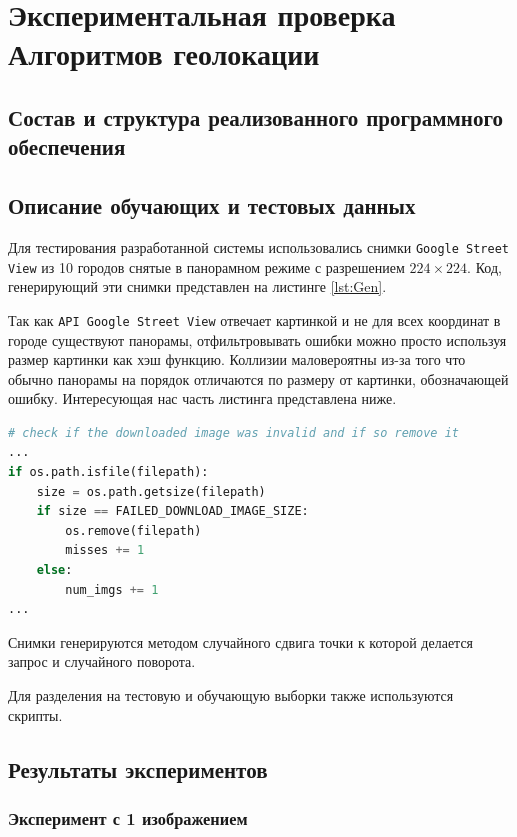 \chapter{Экспериментальная проверка Алгоритмов геолокации}

\section{Состав и структура реализованного программного обеспечения}

\section{Описание обучающих и тестовых данных}

Для тестирования разработанной системы использовались снимки \texttt{Google Street View} из 10 городов снятые в панорамном режиме с разрешением $ 224\times224 $. Код, генерирующий эти снимки представлен на листинге \ref{lst:Gen}.

Так как \texttt{API Google Street View} отвечает картинкой и не для всех координат в городе существуют панорамы, отфильтровывать ошибки можно просто используя размер картинки
как хэш функцию. Коллизии маловероятны из-за того что обычно панорамы на порядок отличаются по размеру от картинки, обозначающей ошибку. Интересующая нас часть листинга представлена ниже.

\begin{lstlisting}[language=python, float=tb,frame=lines,label=lst:frag1]
# check if the downloaded image was invalid and if so remove it
...
if os.path.isfile(filepath):
	size = os.path.getsize(filepath)
	if size == FAILED_DOWNLOAD_IMAGE_SIZE:
		os.remove(filepath)
		misses += 1
	else:
		num_imgs += 1
...
\end{lstlisting}

Снимки генерируются методом случайного сдвига точки к которой делается запрос и случайного поворота.

Для разделения на тестовую и обучающую выборки также используются скрипты.

\section{Результаты экспериментов}

\subsection{Эксперимент с 1 изображением}

